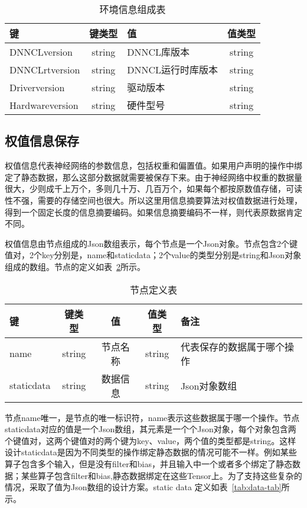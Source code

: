 \begin{table}[htb]
  \centering\small
  \caption{环境信息组成表}
  \label{tab:env-node}
  \begin{tabular}{lclc}
    \toprule
    键        & 键类型    & 值    & 值类型                         \\
    \midrule
    DNNCLversion   & string  & DNNCL库版本       &string\\
    DNNCLrtversion & string  & DNNCL运行时库版本 &string\\
    Driverversion  & string  & 驱动版本          &string\\
    Hardwareversion & string  & 硬件型号 & string \\
    \bottomrule
  \end{tabular}
\end{table}

\subsection {权值信息保存}
权值信息代表神经网络的参数信息，包括权重和偏置值。如果用户声明的操作中绑定了静态数据，那么这部分数据就需要被保存下来。由于神经网络中权重的数据量很大，少则成千上万个，多则几十万、几百万个，如果每个都按原数值存储，可读性不强，需要的存储空间也很大。所以这里用信息摘要算法对权值数据进行处理，得到一个固定长度的信息摘要编码。如果信息摘要编码不一样，则代表原数据肯定不同。

权值信息由节点组成的Json数组表示，每个节点是一个Json对象。节点包含2个键值对，2个key分别是，name和staticdata；2个value的类型分别是string和Json对象组成的数组。节点的定义如表~\ref{tab:node-tab}所示。

\begin{table}[htb]
  \centering\small
  \caption{节点定义表}
  \label{tab:node-tab}
  \begin{tabular}{lcccl}
    \toprule
    键        & 键类型    & 值    & 值类型     &备注                    \\
    \midrule
    name   & string  & 节点名称 &string  &代表保存的数据属于哪个操作\\
    staticdata & string  & 数据信息 &string & Json对象数组 \\
    \bottomrule
  \end{tabular}
\end{table}

节点name唯一，是节点的唯一标识符，name表示这些数据属于哪一个操作。节点staticdata对应的值是一个Json数组，其元素是一个个Json对象，每个对象包含两个键值对，这两个键值对的两个键为key、value，两个值的类型都是string。这样设计staticdata是因为不同类型的操作绑定静态数据的情况可能不一样。例如某些算子包含多个输入，但是没有filter和bias，并且输入中一个或者多个绑定了静态数据；某些算子包含filter和bias,静态数据绑定在这些Tensor上。为了支持这些复杂的情况，采取了值为Json数组的设计方案。static data 定义如表~\ref{tab:data-tab}所示。

